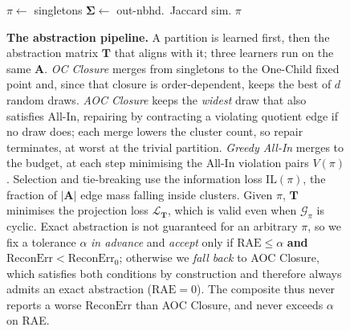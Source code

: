 \begin{figure}[t]
\begin{minipage}[t]{0.32\textwidth}
\begin{algorithm}[H]\footnotesize{}
\SetAlgoLined\DontPrintSemicolon
\SetAlCapFnt{\scriptsize}\SetAlCapNameFnt{\scriptsize}
\caption{Greedy All-In}\label{alg:greedy}
$\pi\leftarrow$ singletons 
$\mathbf{\Sigma}\leftarrow$ out-nbhd.\ Jaccard sim.\;
\Return $\pi$\;
\end{algorithm}
\end{minipage}

\caption{\textbf{The abstraction pipeline.} A partition is learned first, then the abstraction
matrix $\mathbf{T}$ that aligns with it; three learners run on the same $\mathbf{A}$.
\emph{OC Closure} merges from singletons to the One-Child fixed point and, since that closure
is order-dependent, keeps the best of $d$ random draws. \emph{AOC Closure} keeps the
\emph{widest} draw that also satisfies All-In, repairing by contracting a violating quotient
edge if no draw does; each merge lowers the cluster count, so repair terminates, at worst at
the trivial partition. \emph{Greedy All-In} merges to the budget, at each step minimising the
All-In violation pairs $V(\pi)$. Selection and tie-breaking use the information loss
$\mathrm{IL}(\pi)$, the fraction of $|\mathbf{A}|$ edge mass falling inside clusters. Given
$\pi$, $\mathbf{T}$ minimises the projection loss $\mathcal{L}_{\mathbf{T}}$, which is valid
even when $\mathcal{G}_{\pi}$ is cyclic. Exact abstraction is not guaranteed for an arbitrary
$\pi$, so we fix a tolerance $\alpha$ \emph{in advance} and \emph{accept} only if
$\mathrm{RAE}\leq\alpha$ \textbf{and} $\mathrm{ReconErr}<\mathrm{ReconErr}_{0}$; otherwise we
\emph{fall back} to AOC Closure, which satisfies both conditions by construction and therefore
always admits an exact abstraction ($\mathrm{RAE}=0$). The composite thus never reports a
worse $\mathrm{ReconErr}$ than AOC Closure, and never exceeds $\alpha$ on RAE.}
\label{fig:pipeline}
\end{figure}
